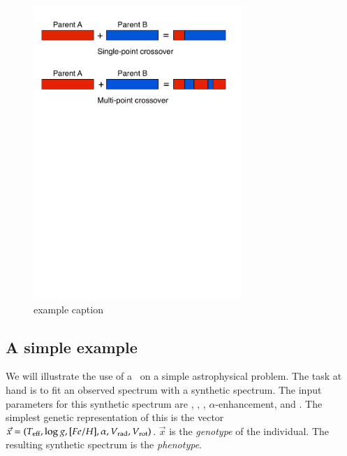 \begin{figure}[htbp] %
   \centering
   \includegraphics[width=0.7\textwidth,trim=0 18cm 0 0]{chapter_dalek/plots/crossovers.pdf} 
   \caption{example caption}
   \label{fig:crossover}
\end{figure}





\subsection{A simple example}
We will illustrate the use of a \ga\ on a simple astrophysical problem. The task at hand is to fit an observed spectrum with a synthetic spectrum. The input parameters for this synthetic spectrum are \teff, \logg, \feh, $\alpha$-enhancement, \vrad and \vrot. The simplest genetic representation of this is the vector $\vec{x} = (T_{\rm eff}, \log{g}, [Fe/H], \alpha, \hbox{$V_{\textrm{rad}}$}, \hbox{$V_{\textrm{rot}}$})$. $\vec{x}$ is the \textit{genotype} of the individual. The resulting synthetic spectrum is the \textit{phenotype}. 

